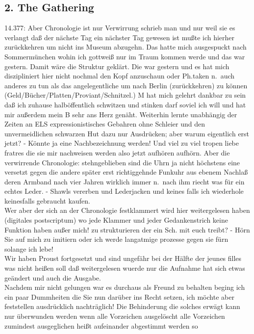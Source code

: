 \documentclass[
]{article}
\author{}
\date{\vspace{-2.5em}}
\begin{document}
\subsection{2. The Gathering}\label{the-gathering}

14.377: Aber Chronologie ist nur Verwirrung schrieb man und nur weil sie
es verlangt daß der nächste Tag ein nächster Tag gewesen ist mußte ich
hierher zurückkehren um nicht ins Museum abzugehn. Das hatte mich
ausgespuckt nach Sommermünchen wohin ich gottweiß nur im Traum kommen
werde und das war gestern. Damit wäre die Struktur geklärt. Die war
gestern und es hat mich diszipliniert hier nicht nochmal den Kopf
anzuschaun oder Ph.taken n.~auch anderes zu tun als das angelegentliche
um nach Berlin (zurückkehren) zu können
(Geld/Bücher/Platten/Proviant/Schnitzel.) M hat mich gelehrt dankbar zu
sein daß ich zuhause halböffentlich schwitzen und stinken darf soviel
ich will und hat mir außerdem mein B sehr ans Herz genäht. Weiterhin
lernte unabhängig der Zeiten an ELS expressionistisches Gebahren ohne
Schleier und den unvermeidlichen schwarzen Hut dazu nur Ausdrücken; aber
warum eigentlich erst jetzt? - Könnte ja eine Nachbezeichnung werden!
Und viel zu viel tropen liebe fratres die sie mir nachweisen werden also
jetzt aufhören aufhörn. Aber die verwirrende Chronologie: stehngeblieben
sind die Uhrn ja nicht höchstens eine versetzt gegen die andere später
erst richtiggehnde Funkuhr aus ebenem Nachlaß deren Armband nach vier
Jahren wirklich immer n.~nach ihm riecht was für ein echtes Leder. -
Shawls vererben und Lederjacken und keines falls ich wiederhole
keinesfalls gebraucht kaufen.\\
Wer aber der sich an der Chronologie festklammert wird hier
weitergelesen haben (digitales postscriptum) wo jede Klammer und jeder
Gedankenstrich keine Funktion haben außer mich! zu strukturieren der ein
Sch. mit euch treibt? - Hörn Sie auf mich zu imitiern oder ich werde
langatmige prozesse gegen sie fürn solange ich lebe!\\
Wir haben Proust fortgesetzt und sind ungefähr bei der Hälfte der jeunes
filles was nicht heißen soll daß weitergelesen wuerde nur die Aufnahme
hat sich etwas geändert und auch die Ausgabe.\\
Nachdem mir nicht gelungen war es durchaus als Freund zu behalten beging
ich ein paar Dummheiten die Sie nun darüber ins Recht setzen, ich möchte
aber feststellen ausdrücklich nachträglich! Die Behinderung die solches
erwägt kann nur überwunden werden wenn alle Vorzeichen ausgelöscht alle
Vorzeichen zumindest ausgeglichen heißt aufeinander abgestimmt werden so
\end{document}
